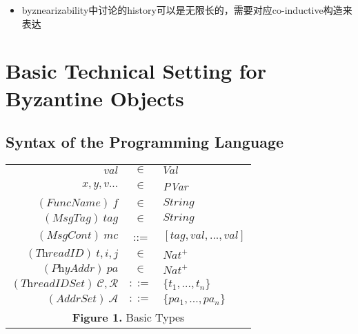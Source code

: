 \documentclass[UTF8, 8pt, a4paper ]{ctexart}
\newcommand{\addrSet}{\mathcal{A}}
\begin{document}
\begin{small}
\begin{itemize}
		\item byznearizability中讨论的history可以是无限长的，需要对应co-inductive构造来表达\\
	\end{itemize}
	
	
	\pagebreak

	\section{Basic Technical Setting for Byzantine Objects}
	
	
	
	\newcommand{\auxFuncs}{\mathcal{F}_\textsf{aux}}
	
	\subsection{Syntax of the Programming Language}
	
		\begin{longtable}{rcl}
			\hline
				$ val $ & $ \in $ & $ \textit{Val} $ \\
				
				$ x, y, v...  $ & $ \in $ & \textit{PVar} \\ 
				
				$ (\!\textit{FuncName})\ f  $ & $ \in $ & $ \textit{String} $\\
				
				
				$ (\!\textit{MsgTag})\ \textit{tag} $ & $ \in $ & $ \textit{String} $\\
				
				$ (\!\textit{MsgCont})\ mc $ & ::= & $ [\textit{tag}, val, ..., val] $ \\
				
				$ (\!\textit{ThreadID}) \ t, i, j $ & $ \in $ & $ \textit{Nat}^{+} $ \\
				
				$ (\!\textit{PhyAddr})\ pa $ & $ \in $ & $ \textit{Nat}^{+} $ \\
				
				$ (\!\textit{ThreadIDSet})\ \mathcal{C}, \mathcal{R} $ & $ ::= $ & $ \{ t_1, ..., t_n \} $ \\
				
				$ (\!\textit{AddrSet})\ \addrSet $ & $ ::= $ & $ \{ pa_1, ..., pa_n \} $ \\
				\hline
				\multicolumn{3}{c}{\textbf{Figure 1.} Basic Types} \\
		\end{longtable}
				

\end{small}
\end{document}
